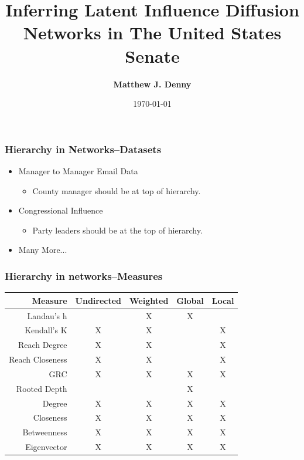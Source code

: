 \documentclass[xcolor={table}]{beamer}
\title{Inferring Latent Influence Diffusion Networks in The United States Senate}
\author{\Large\textbf{Matthew J. Denny}}
\institute{\Large Penn State University ---
 \texttt{mzd5530@psu.edu}\\
 \color{blue}\texttt{www.mjdenny.com}\\
 \texttt{@MatthewJDenny}
}
\date{ \today }
\begin{document}






\begin{frame}\frametitle{Hierarchy in Networks--Datasets}
	\LARGE
\begin{itemize}
	\item Manager to Manager Email Data
	\vspace{.2in}
	\begin{itemize}
		\Large
		\item County manager should be at top of hierarchy.
	\end{itemize}
	\vspace{.2in}

	\item Congressional Influence
	\vspace{.2in}
	\begin{itemize}
		\Large
		\item Party leaders should be at the top of hierarchy.
	\end{itemize}
	\item Many More...
\end{itemize}
\end{frame}

\begin{frame}\frametitle{Hierarchy in networks--Measures}
\begin{table}
	\begin{tabular}{| r || c | c | c | c |}
		\hline
		Measure & Undirected & Weighted & Global & Local \\
		\hline
		Landau's h & & X& X& \\
		Kendall's K & X& X& &X\\
		Reach Degree & X& X& &X\\
		Reach Closeness & X& X& &X\\
		GRC & X& X& X&X\\
		Rooted Depth & & & X&\\
		Degree & X& X& X&X\\
		Closeness & X& X& X&X\\
		Betweenness & X& X& X&X\\
		Eigenvector &  X& X& X& X \\
		\hline
	\end{tabular}
\end{table}
\end{frame}
\end{document}
